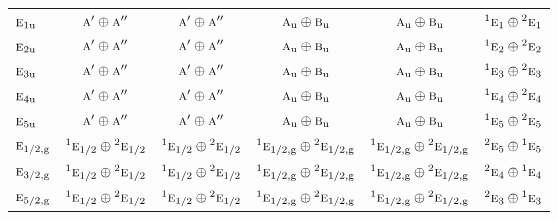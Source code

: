 \documentclass[10pt,a4paper]{article}
\numberwithin{equation}{section}
\newcommand{\irr}[1]{\text{\normalfont\scshape #1}}
\newcommand{\conjpair}[1]{{}^{#1}}
\newcommand{\ptag}[1]{\mathrm{#1}}
\begin{document}
{\begin{longtable}{@{}lccccc@{}}
$\irr{e}_{1\ptag{u}}$ & $\irr{a}'\oplus \irr{a}''$ & $\irr{a}'\oplus \irr{a}''$ & $\irr{a}_{\ptag{u}}\oplus \irr{b}_{\ptag{u}}$ & $\irr{a}_{\ptag{u}}\oplus \irr{b}_{\ptag{u}}$ & $\conjpair{1}\irr{e}_{1}\oplus \conjpair{2}\irr{e}_{1}$\\
$\irr{e}_{2\ptag{u}}$ & $\irr{a}'\oplus \irr{a}''$ & $\irr{a}'\oplus \irr{a}''$ & $\irr{a}_{\ptag{u}}\oplus \irr{b}_{\ptag{u}}$ & $\irr{a}_{\ptag{u}}\oplus \irr{b}_{\ptag{u}}$ & $\conjpair{1}\irr{e}_{2}\oplus \conjpair{2}\irr{e}_{2}$\\
$\irr{e}_{3\ptag{u}}$ & $\irr{a}'\oplus \irr{a}''$ & $\irr{a}'\oplus \irr{a}''$ & $\irr{a}_{\ptag{u}}\oplus \irr{b}_{\ptag{u}}$ & $\irr{a}_{\ptag{u}}\oplus \irr{b}_{\ptag{u}}$ & $\conjpair{1}\irr{e}_{3}\oplus \conjpair{2}\irr{e}_{3}$\\
$\irr{e}_{4\ptag{u}}$ & $\irr{a}'\oplus \irr{a}''$ & $\irr{a}'\oplus \irr{a}''$ & $\irr{a}_{\ptag{u}}\oplus \irr{b}_{\ptag{u}}$ & $\irr{a}_{\ptag{u}}\oplus \irr{b}_{\ptag{u}}$ & $\conjpair{1}\irr{e}_{4}\oplus \conjpair{2}\irr{e}_{4}$\\
$\irr{e}_{5\ptag{u}}$ & $\irr{a}'\oplus \irr{a}''$ & $\irr{a}'\oplus \irr{a}''$ & $\irr{a}_{\ptag{u}}\oplus \irr{b}_{\ptag{u}}$ & $\irr{a}_{\ptag{u}}\oplus \irr{b}_{\ptag{u}}$ & $\conjpair{1}\irr{e}_{5}\oplus \conjpair{2}\irr{e}_{5}$\\
$\irr{e}_{1/2,\ptag{g}}$ & $\conjpair{1}\irr{e}_{1/2}\oplus \conjpair{2}\irr{e}_{1/2}$ & $\conjpair{1}\irr{e}_{1/2}\oplus \conjpair{2}\irr{e}_{1/2}$ & $\conjpair{1}\irr{e}_{1/2,\ptag{g}}\oplus \conjpair{2}\irr{e}_{1/2,\ptag{g}}$ & $\conjpair{1}\irr{e}_{1/2,\ptag{g}}\oplus \conjpair{2}\irr{e}_{1/2,\ptag{g}}$ & $\conjpair{2}\irr{e}_{5}\oplus \conjpair{1}\irr{e}_{5}$\\
$\irr{e}_{3/2,\ptag{g}}$ & $\conjpair{1}\irr{e}_{1/2}\oplus \conjpair{2}\irr{e}_{1/2}$ & $\conjpair{1}\irr{e}_{1/2}\oplus \conjpair{2}\irr{e}_{1/2}$ & $\conjpair{1}\irr{e}_{1/2,\ptag{g}}\oplus \conjpair{2}\irr{e}_{1/2,\ptag{g}}$ & $\conjpair{1}\irr{e}_{1/2,\ptag{g}}\oplus \conjpair{2}\irr{e}_{1/2,\ptag{g}}$ & $\conjpair{2}\irr{e}_{4}\oplus \conjpair{1}\irr{e}_{4}$\\
$\irr{e}_{5/2,\ptag{g}}$ & $\conjpair{1}\irr{e}_{1/2}\oplus \conjpair{2}\irr{e}_{1/2}$ & $\conjpair{1}\irr{e}_{1/2}\oplus \conjpair{2}\irr{e}_{1/2}$ & $\conjpair{1}\irr{e}_{1/2,\ptag{g}}\oplus \conjpair{2}\irr{e}_{1/2,\ptag{g}}$ & $\conjpair{1}\irr{e}_{1/2,\ptag{g}}\oplus \conjpair{2}\irr{e}_{1/2,\ptag{g}}$ & $\conjpair{2}\irr{e}_{3}\oplus \conjpair{1}\irr{e}_{3}$\\

\end{longtable}}
\end{document}
